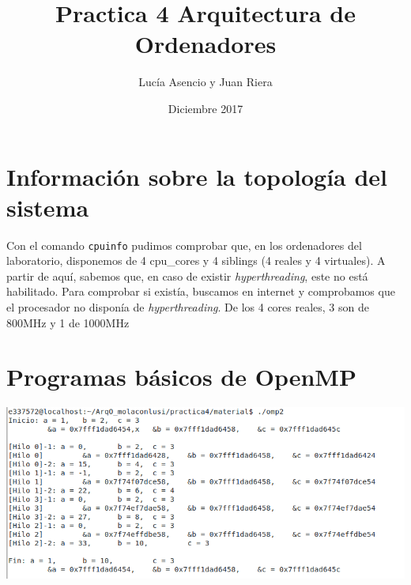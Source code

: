 \documentclass{report}
\title{Practica 4 Arquitectura de Ordenadores}
\author{Lucía Asencio y Juan Riera}
\date{Diciembre 2017}
\newcommand\tab[1][0.6cm]{\hspace*{#1}}
\newcommand\nl{\newline\tab}
\begin{document}
	\maketitle
	
	\section{Información sobre la topología del sistema}
	
	\tab Con el comando \texttt{cpuinfo} pudimos comprobar que, en los ordenadores del laboratorio, disponemos de 4 cpu\_cores y 4 siblings (4 reales y 4 virtuales). A partir de aquí, sabemos que, en caso de existir \textit{hyperthreading}, este no está habilitado. 
	\nl Para comprobar si existía, buscamos en internet y comprobamos que el procesador no disponía de \textit{hyperthreading}.
	\nl  De los 4 cores reales, 3 son de 800MHz y 1 de 1000MHz
	
	\newpage
	\section{Programas básicos de OpenMP}
	
	\begin{center}
		\includegraphics[width=6in]{ej2.png}
	\end{center}
	
\end{document}
